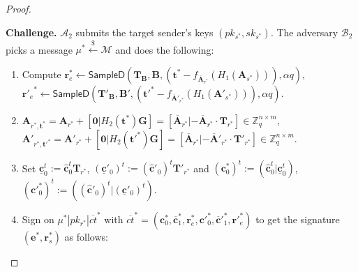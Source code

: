 \documentclass[a4paper,11pt,onecolumn]{elsarticle}
\begin{document}
\begin{proof}
\begin{description}
				\textbf{Challenge.} $\mathcal{A}_2$ submits the target sender's keys $(pk_{s^*}, sk_{s^*})$. The adversary $\mathcal{B}_2$ picks a message $\mu^*\xleftarrow{\$} \mathcal{M}$ and does the following:
				\begin{enumerate}
			\item Compute $\textbf{r}_e^* \leftarrow \textsf{SampleD}(\textbf{T}_\textbf{B}, \textbf{B}, (\textbf{t}^*-f_{\overline{\textbf{A}}_{r^*}}(H_1(\textbf{A}_{s^*}))),\alpha q)$,  ${\textbf{r}'_e}^* \leftarrow \textsf{SampleD}(\textbf{T}'_\textbf{B}, \textbf{B}', (\textbf{t}'^*-f_{\overline{\textbf{A}}'_{r^*}}(H_1(\textbf{A}'_{s^*}))),\alpha q)$.  
			\item $\mathbf{A}_{r^*,\textbf{t}^*}=\mathbf{A}_{r^*}+[\textbf{0}|H_2(\textbf{t}^*)\mathbf{G}]=[\overline{\mathbf{A}}_{r^*}|-\overline{\mathbf{A}}_{r^*}\cdot \mathbf{T}_{r^*}] \in \mathbb{Z}_q^{n \times m}$,\\ $\mathbf{A}'_{r^*,\textbf{t}'^*}=\mathbf{A}'_{r^*}+[\textbf{0}|H_2(\textbf{t}'^*)\mathbf{G}]=[\overline{\mathbf{A}}_{r^*}|-\overline{\mathbf{A}}'_{r^*}\cdot \mathbf{T}'_{r^*}] \in \mathbb{Z}_q^{n \times m}$.
			\item Set $\underline{\textbf{c}}_0^t:=\hat{\textbf{c}}_0^t\textbf{T}_{r^*}$, $(\underline{\textbf{c}}'_0)^t:=(\hat{\textbf{c}}'_0)^t\textbf{T}'_{r^*}$ and ${(\textbf{c}^*_0)}^t:=(\hat{\textbf{c}}_0^t|\underline{\textbf{c}}_0^t)$, ${(\textbf{c}'^*_0)}^t:=((\hat{\textbf{c}}'_0)^t|(\underline{\textbf{c}}'_0)^t)$.
		
			\item Sign on $\mu^*| pk_{r^*}|\overline{ct}^*$ with $\overline{ct}^*=(\textbf{c}^*_0, \overline{\textbf{c}}^*_1, \textbf{r}^*_e, \textbf{c}'^*_0, \overline{\textbf{c}}'^*_1, \textbf{r}'^*_e)$ to get the signature $(\textbf{e}^*, \textbf{r}_s^*)$ as follows:					
							\begin{enumerate}
							

\end{enumerate}
\end{enumerate}
\end{description}
\end{proof}
\end{document}
